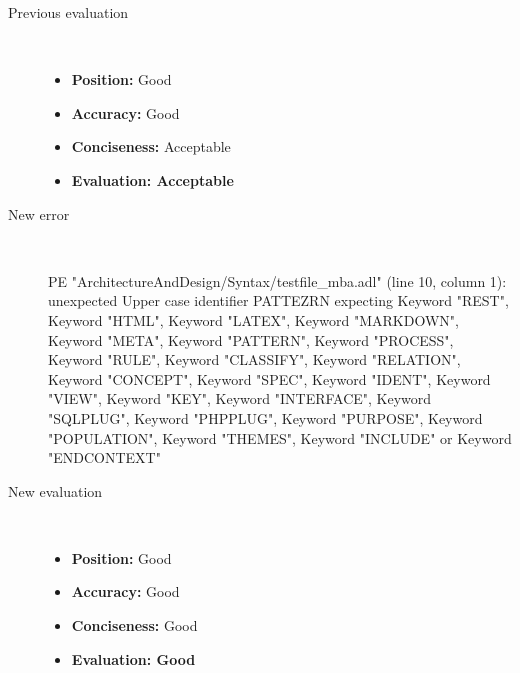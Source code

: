\begin{description}
\begin{haskell}
\end{haskell}
  \item[Previous evaluation]~\\
    \begin{itemize}
    \item \textbf{Position:} Good
    \item \textbf{Accuracy:} Good
    \item \textbf{Conciseness:} Acceptable
    \item \textbf{Evaluation: Acceptable}
    \end{itemize}
  \item[New error]~\\
\begin{haskell}
PE "ArchitectureAndDesign/Syntax/testfile_mba.adl" (line 10, column 1):
unexpected Upper case identifier PATTEZRN
expecting Keyword "REST", Keyword "HTML", Keyword "LATEX", Keyword "MARKDOWN", Keyword "META", Keyword "PATTERN", Keyword "PROCESS", Keyword "RULE", Keyword "CLASSIFY", Keyword "RELATION", Keyword "CONCEPT", Keyword "SPEC", Keyword "IDENT", Keyword "VIEW", Keyword "KEY", Keyword "INTERFACE", Keyword "SQLPLUG", Keyword "PHPPLUG", Keyword "PURPOSE", Keyword "POPULATION", Keyword "THEMES", Keyword "INCLUDE" or Keyword "ENDCONTEXT"
\end{haskell}
  \item[New evaluation]~\\
    \begin{itemize}
    \item \textbf{Position:} Good
    \item \textbf{Accuracy:} Good
    \item \textbf{Conciseness:} Good
    \item \textbf{Evaluation: Good}
    \end{itemize}
  \end{description}

\hrulefill

